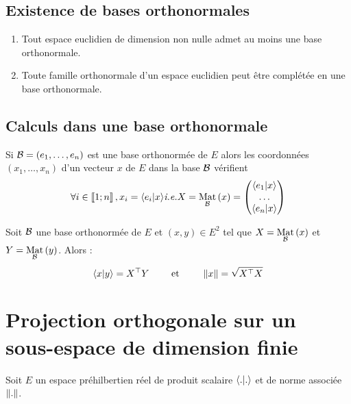 \subsection{Existence de bases orthonormales}
\begin{defprop}
    \begin{enumerate}
        \item Tout espace euclidien de dimension non nulle admet au moins une base orthonormale.
        \item Toute famille orthonormale d’un espace euclidien peut être complétée en une base orthonormale.
    \end{enumerate}
\end{defprop}
\subsection{Calculs dans une base orthonormale}
\begin{defprop}
    Si \(\cal{B} = (e_1, \dots , e_n)\) est une base orthonormée de \(E\) alors les coordonnées \((x_1, \dots , x_n)\) d’un vecteur \(x\) de \(E\) dans la base \(\cal{B}\) vérifient
        \[\forall i \in \interventierii{1}{n}, x_i = \scal{e_i}{x}\ie X = \Mat{\cal{B}}{x} =
        \begin{pmatrix}
        \scal{e_1}{x}   \\
        \dots   \\
        \scal{e_n}{x}   
        \end{pmatrix}
        \]
\end{defprop}
\begin{defprop}
    Soit \(\cal{B}\) une base orthonormée de \(E\) et \((x, y) \in E^2\) tel que \(X = \Mat{\cal{B}}{x}\) et \(Y = \Mat{\cal{B}}{y}\).
    Alors :
    \[\scal{x}{y} = \trans{X}Y \qquad\text{ et }\qquad \norme{x} = \sqrt{\trans{X}X}\]
\end{defprop}

\section{Projection orthogonale sur un sous-espace de dimension finie}
    Soit \(E\) un espace préhilbertien réel de produit scalaire \(\scal{.}{.}\) et de norme associée \(\norme{.}\).
